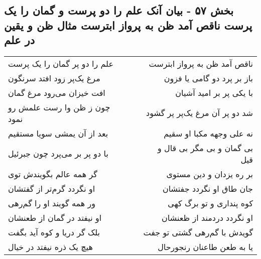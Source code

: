 \begin{center}
\section*{بخش ۵۷ - بیان آنک علم را دو پرست و گمان را یک پرست ناقص آمد ظن به پرواز  ابترست مثال ظن و یقین در علم}
\label{sec:sh057}
\begin{longtable}{l p{0.5cm} r}
علم را دو پر گمان را یک پرست
&&
ناقص آمد ظن به پرواز ابترست
\\
مرغ یک‌پر زود افتد سرنگون
&&
باز بر پرد دو گامی یا فزون
\\
افت خیزان می‌رود مرغ گمان
&&
با یکی پر بر امید آشیان
\\
چون ز ظن وا رست علمش رو نمود
&&
شد دو پر آن مرغ یک‌پر پر گشود
\\
بعد از آن یمشی سویا مستقیم
&&
نه علی وجهه مکبا او سقیم
\\
با دو پر بر می‌پرد چون جبرئیل
&&
بی گمان و بی مگر بی قال و قیل
\\
گر همه عالم بگویندش توی
&&
بر ره یزدان و دین مستوی
\\
او نگردد گرم‌تر از گفتشان
&&
جان طاق او نگردد جفتشان
\\
ور همه گویند او را گم‌رهی
&&
کوه پنداری و تو برگ کهی
\\
او نیفتد در گمان از طعنشان
&&
او نگردد دردمند از ظعنشان
\\
بلک گر دریا و کوه آید بگفت
&&
گویدش با گم‌رهی گشتی تو جفت
\\
هیچ یک ذره نیفتد در خیال
&&
یا به طعن طاعنان رنجورحال
\\
\end{longtable}
\end{center}
